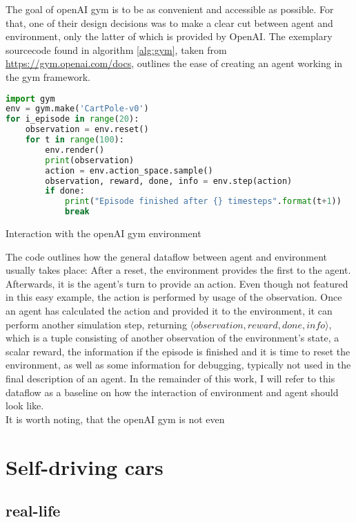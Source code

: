 The goal of openAI gym is to be as convenient and accessible as possible. For that, one of their design decisions was to make a clear cut between agent and environment, only the latter of which is provided by OpenAI. The exemplary sourcecode found in algorithm \ref{alg:gym}, taken from \url{https://gym.openai.com/docs}, outlines the ease of creating an agent working in the gym framework.
\begin{algorithm}[h]
\begin{lstlisting}[language=Python,frame=none]
import gym
env = gym.make('CartPole-v0')
for i_episode in range(20):
	observation = env.reset()
	for t in range(100):
		env.render()
		print(observation)
		action = env.action_space.sample()
		observation, reward, done, info = env.step(action)
		if done:
			print("Episode finished after {} timesteps".format(t+1))
			break
\end{lstlisting}%
\caption{Interaction with the openAI gym environment}
\label{alg:gym}
\end{algorithm}
The code outlines how the general dataflow between agent and environment usually takes place: After a reset, the environment provides the first  to the agent. Afterwards, it is the agent's turn to provide an action. Even though not featured in this easy example, the action is performed by usage of the observation. Once an agent has calculated the action and provided it to the environment, it can perform another simulation step, returning $\langle observation, reward, done, info\rangle$, which is a tuple consisting of another observation of the environment's state, a scalar reward, the information if the episode is finished and it is time to reset the environment, as well as some information for debugging, typically not used in the final description of an agent. In the remainder of this work, I will refer to this dataflow as a baseline on how the interaction of environment and agent should look like.\\

It is worth noting, that the openAI gym is not even 


\section{Self-driving cars}

\subsection{real-life}


